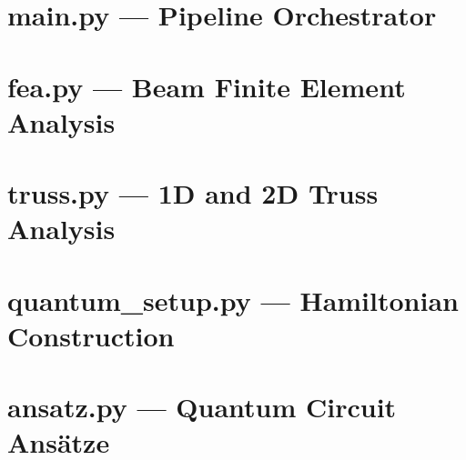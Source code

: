 \documentclass[12pt, a4paper]{article}
\begin{document}
\section{main.py --- Pipeline Orchestrator}



\section{fea.py --- Beam Finite Element Analysis}



\section{truss.py --- 1D and 2D Truss Analysis}



\section{quantum\_setup.py --- Hamiltonian Construction}



\section{ansatz.py --- Quantum Circuit Ans\"atze}


\end{document}
